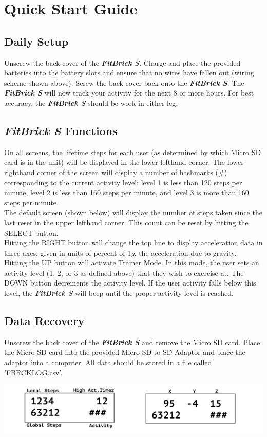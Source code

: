 \documentclass{article}
\begin{document}
\section{Quick Start Guide}
\subsection{Daily Setup}
Unscrew the back cover of the \textbf{\textit{FitBrick S}}. Charge and place the provided batteries into the battery slots and ensure that no wires have fallen out (wiring scheme shown above). Screw the back cover back onto the \textbf{\textit{FitBrick S}}. The \textbf{\textit{FitBrick S}} will now track your activity for the next 8 or more hours. For best accuracy, the \textbf{\textit{FitBrick S}} should be work in either leg.

\subsection{\textbf{\textit{FitBrick S}} Functions}
On all screens, the lifetime steps for each user (as determined by which Micro SD card is in the unit) will be displayed in the lower lefthand corner. The lower righthand corner of the screen will display a number of hashmarks (\#) corresponding to the current activity level: level 1 is less than 120 steps per minute, level 2 is less than 160 steps per minute, and level 3 is more than 160 steps per minute. \\
The default screen (shown below) will display the number of steps taken since the last reset in the upper lefthand corner. This count can be reset by hitting the SELECT button. \\
Hitting the RIGHT button will change the top line to display acceleration data in three axes, given in units of percent of 1\textit{g}, the acceleration due to gravity. \\
Hitting the UP button will activate Trainer Mode. In this mode, the user sets an activity level (1, 2, or 3 as defined above) that they wish to exercise at. The DOWN button decrements the activity level. If the user activity falls below this level, the \textbf{\textit{FitBrick S}} will beep until the proper activity level is reached. 
\subsection{Data Recovery}
Unscrew the back cover of the \textbf{\textit{FitBrick S}} and remove the Micro SD card. Place the Micro SD card into the provided Micro SD to SD Adaptor and place the adaptor into a computer. All data should be stored in a file called 'FBRCKLOG.csv'. 
\begin{center}
	\includegraphics[width=6.5in]{screen}
\end{center}





\end{document}
